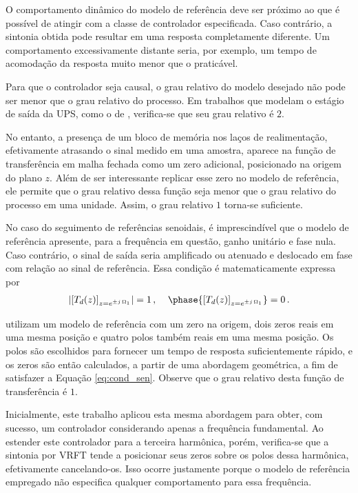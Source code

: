\documentclass[repeatfields,oneside,overleaf]{tcc}
\newcommand{\mycdot}{ \, }
\begin{document}
O comportamento dinâmico do modelo de referência deve ser próximo ao que é possível de atingir com a classe de controlador especificada.
Caso contrário, a sintonia obtida pode resultar em uma resposta completamente diferente.
Um comportamento excessivamente distante seria, por exemplo, um tempo de acomodação da resposta muito menor que o praticável.

Para que o controlador seja causal, o grau relativo do modelo desejado não pode ser menor que o grau relativo do processo.
Em trabalhos que modelam o estágio de saída da UPS, como o de \textcite{Pereira2014}, verifica-se que seu grau relativo é $2$.

\newpage
No entanto, a presença de um bloco de memória nos laços de realimentação, efetivamente atrasando o sinal medido em uma amostra, aparece na função de transferência em malha fechada como um zero adicional, posicionado na origem do plano $z$.
Além de ser interessante replicar esse zero no modelo de referência, ele permite que o grau relativo dessa função seja menor que o grau relativo do processo em uma unidade.
Assim, o grau relativo $1$ torna-se suficiente.

No caso do seguimento de referências senoidais, é imprescindível que o modelo de referência apresente, para a frequência em questão, ganho unitário e fase nula.
Caso contrário, o sinal de saída seria amplificado ou atenuado e deslocado em fase com relação ao sinal de referência.
Essa condição é matematicamente expressa por
\begin{equation}
\begin{aligned}
    \left| \left[ T_d(z) \right]_{z = e^{\pm j \mycdot \Omega_1 }} \right| = 1
    \,,\;
    &&
    \phase{\left[ T_d(z) \right]_{z = e^{\pm j \mycdot \Omega_1 }}} = 0
    \,.
\end{aligned}
\label{eq:cond_sen}
\end{equation}

\textcite{Corleta2015, Corleta2016, Bruna2020} utilizam um modelo de referência com um zero na origem, dois zeros reais em uma mesma posição e quatro polos também reais em uma mesma posição.
Os polos são escolhidos para fornecer um tempo de resposta suficientemente rápido, e os zeros são então calculados, a partir de uma abordagem geométrica, a fim de satisfazer a Equação \eqref{eq:cond_sen}.
Observe que o grau relativo desta função de transferência é $1$.

Inicialmente, este trabalho aplicou esta mesma abordagem para obter, com sucesso, um controlador considerando apenas a frequência fundamental.
Ao estender este controlador para a terceira harmônica, porém, verifica-se que a sintonia por VRFT tende a posicionar seus zeros sobre os polos dessa harmônica, efetivamente cancelando-os.
Isso ocorre justamente porque o modelo de referência empregado não especifica qualquer comportamento para essa frequência.
\end{document}
